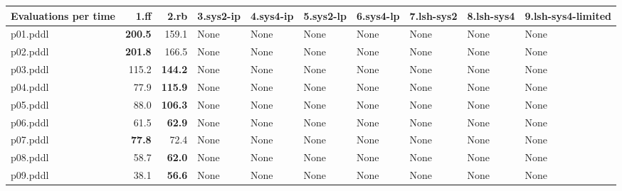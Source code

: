 \documentclass{article}
\begin{document}
\begin{tabular}{@{}lrrrrrrrrr@{}}
Evaluations per time & 1.ff & 2.rb & 3.sys2-ip & 4.sys4-ip & 5.sys2-lp & 6.sys4-lp & 7.lsh-sys2 & 8.lsh-sys4 & 9.lsh-sys4-limited \\
\midrule
p01.pddl & \textbf{200.5} & 159.1 & \multicolumn{1}{|l|}{None} & \multicolumn{1}{|l|}{None} & \multicolumn{1}{|l|}{None} & \multicolumn{1}{|l|}{None} & \multicolumn{1}{|l|}{None} & \multicolumn{1}{|l|}{None} & \multicolumn{1}{|l|}{None} \\
p02.pddl & \textbf{201.8} & 166.5 & \multicolumn{1}{|l|}{None} & \multicolumn{1}{|l|}{None} & \multicolumn{1}{|l|}{None} & \multicolumn{1}{|l|}{None} & \multicolumn{1}{|l|}{None} & \multicolumn{1}{|l|}{None} & \multicolumn{1}{|l|}{None} \\
p03.pddl & 115.2 & \textbf{144.2} & \multicolumn{1}{|l|}{None} & \multicolumn{1}{|l|}{None} & \multicolumn{1}{|l|}{None} & \multicolumn{1}{|l|}{None} & \multicolumn{1}{|l|}{None} & \multicolumn{1}{|l|}{None} & \multicolumn{1}{|l|}{None} \\
p04.pddl & 77.9 & \textbf{115.9} & \multicolumn{1}{|l|}{None} & \multicolumn{1}{|l|}{None} & \multicolumn{1}{|l|}{None} & \multicolumn{1}{|l|}{None} & \multicolumn{1}{|l|}{None} & \multicolumn{1}{|l|}{None} & \multicolumn{1}{|l|}{None} \\
p05.pddl & 88.0 & \textbf{106.3} & \multicolumn{1}{|l|}{None} & \multicolumn{1}{|l|}{None} & \multicolumn{1}{|l|}{None} & \multicolumn{1}{|l|}{None} & \multicolumn{1}{|l|}{None} & \multicolumn{1}{|l|}{None} & \multicolumn{1}{|l|}{None} \\
p06.pddl & 61.5 & \textbf{62.9} & \multicolumn{1}{|l|}{None} & \multicolumn{1}{|l|}{None} & \multicolumn{1}{|l|}{None} & \multicolumn{1}{|l|}{None} & \multicolumn{1}{|l|}{None} & \multicolumn{1}{|l|}{None} & \multicolumn{1}{|l|}{None} \\
p07.pddl & \textbf{77.8} & 72.4 & \multicolumn{1}{|l|}{None} & \multicolumn{1}{|l|}{None} & \multicolumn{1}{|l|}{None} & \multicolumn{1}{|l|}{None} & \multicolumn{1}{|l|}{None} & \multicolumn{1}{|l|}{None} & \multicolumn{1}{|l|}{None} \\
p08.pddl & 58.7 & \textbf{62.0} & \multicolumn{1}{|l|}{None} & \multicolumn{1}{|l|}{None} & \multicolumn{1}{|l|}{None} & \multicolumn{1}{|l|}{None} & \multicolumn{1}{|l|}{None} & \multicolumn{1}{|l|}{None} & \multicolumn{1}{|l|}{None} \\
p09.pddl & 38.1 & \textbf{56.6} & \multicolumn{1}{|l|}{None} & \multicolumn{1}{|l|}{None} & \multicolumn{1}{|l|}{None} & \multicolumn{1}{|l|}{None} & \multicolumn{1}{|l|}{None} & \multicolumn{1}{|l|}{None} & \multicolumn{1}{|l|}{None} \\

\end{tabular}
\end{document}
